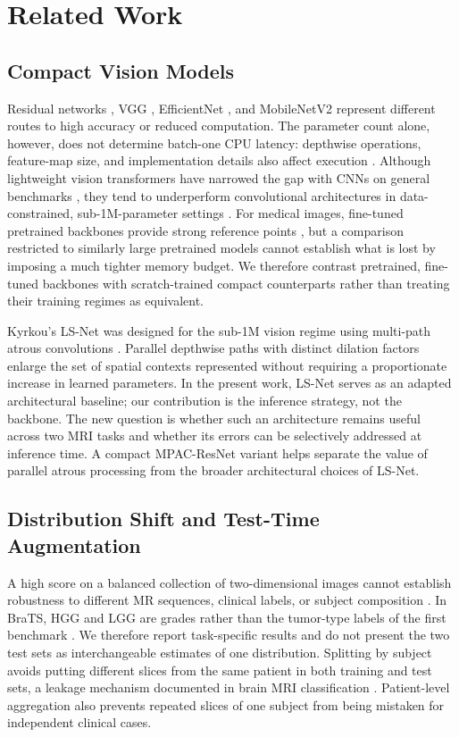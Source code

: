 \section{Related Work}
\subsection{Compact Vision Models}
Residual networks \cite{he2016}, VGG \cite{simonyan2015}, EfficientNet \cite{tan2019}, and MobileNetV2 \cite{sandler2018} represent different routes to high accuracy or reduced computation. The parameter count alone, however, does not determine batch-one CPU latency: depthwise operations, feature-map size, and implementation details also affect execution \cite{kyrkou2026}. Although lightweight vision transformers have narrowed the gap with CNNs on general benchmarks \cite{mehta2022}, they tend to underperform convolutional architectures in data-constrained, sub-1M-parameter settings \cite{kyrkou2026}. For medical images, fine-tuned pretrained backbones provide strong reference points \cite{tajbakhsh2016}, but a comparison restricted to similarly large pretrained models cannot establish what is lost by imposing a much tighter memory budget. We therefore contrast pretrained, fine-tuned backbones with scratch-trained compact counterparts rather than treating their training regimes as equivalent.

Kyrkou's LS-Net was designed for the sub-1M vision regime using multi-path atrous convolutions \cite{kyrkou2026}. Parallel depthwise paths with distinct dilation factors enlarge the set of spatial contexts represented without requiring a proportionate increase in learned parameters. In the present work, LS-Net serves as an adapted architectural baseline; our contribution is the inference strategy, not the backbone. The new question is whether such an architecture remains useful across two MRI tasks and whether its errors can be selectively addressed at inference time. A compact MPAC-ResNet variant helps separate the value of parallel atrous processing from the broader architectural choices of LS-Net.

\subsection{Distribution Shift and Test-Time Augmentation}
A high score on a balanced collection of two-dimensional images cannot establish robustness to different MR sequences, clinical labels, or subject composition \cite{guan2022}. In BraTS, HGG and LGG are grades rather than the tumor-type labels of the first benchmark \cite{menze2015}. We therefore report task-specific results and do not present the two test sets as interchangeable estimates of one distribution. Splitting by subject avoids putting different slices from the same patient in both training and test sets, a leakage mechanism documented in brain MRI classification \cite{yagis2021}. Patient-level aggregation also prevents repeated slices of one subject from being mistaken for independent clinical cases.

